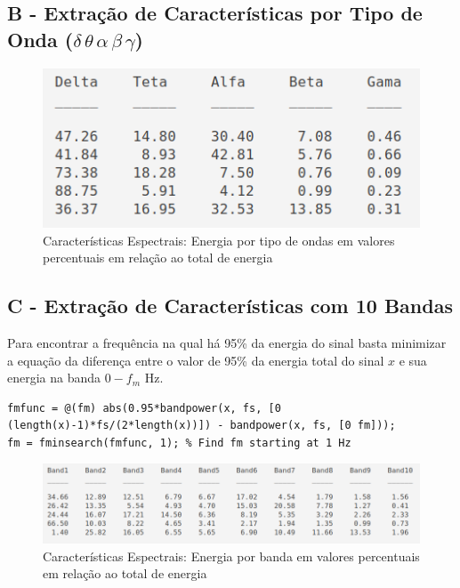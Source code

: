 \documentclass{article}
\begin{document}
\subsection*{B - Extração de Características por Tipo de Onda ($\delta\, \theta\, \alpha\, \beta\, \gamma$)}

\begin{figure}[H]
	\begin{center}
		\includegraphics[scale=0.55]{Figures/Q5_b.png}
		\caption{Características Espectrais: Energia por tipo de ondas em valores percentuais em relação ao total de energia}
		\label{fig:Q5_b}
	\end{center}
\end{figure}

\subsection*{C - Extração de Características com 10 Bandas}
Para encontrar a frequência na qual há 95\% da energia do sinal basta minimizar a equação da diferença entre o valor de 95\% da energia total do sinal $x$ e sua energia na banda $0-f_m$ Hz.

\begin{lstlisting}[style=Matlab-editor]
fmfunc = @(fm) abs(0.95*bandpower(x, fs, [0 (length(x)-1)*fs/(2*length(x))]) - bandpower(x, fs, [0 fm]));
fm = fminsearch(fmfunc, 1); % Find fm starting at 1 Hz
\end{lstlisting}

\begin{figure}[H]
	\begin{center}
		\includegraphics[scale=0.55]{Figures/Q5_c.png}
		\caption{Características Espectrais: Energia por banda em valores percentuais em relação ao total de energia}
		\label{fig:Q5_c}
	\end{center}
\end{figure}
\end{document}

